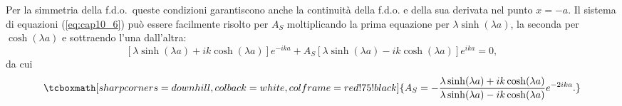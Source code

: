 Per la simmetria della f.d.o.~queste condizioni garantiscono anche la continuità della f.d.o. e della sua derivata nel punto $x=-a$. Il sistema di equazioni (\ref{eq:cap10_6}) può essere facilmente risolto per $A_S$ moltiplicando la prima equazione per $\lambda \sinh (\lambda a)$, la seconda per $\cosh (\lambda a)$ e sottraendo l'una dall'altra:
	\begin{equation}
		\left[\lambda \sinh (\lambda a)+ ik\cosh (\lambda a) \right]e^{-ika}+ A_S \left[\lambda \sinh (\lambda a)-ik \cosh (\lambda a) \right]e^{ika}=0,
	\end{equation}
da cui
	\begin{equation}
		\tcboxmath[sharp corners=downhill, colback=white, colframe=red!75!black]{	
			A_S=-\frac{\lambda \sinh (\lambda a)+ik \cosh (\lambda a)}{\lambda \sinh (\lambda a)-ik \cosh (\lambda a)}e^{-2ika}.
			}
	\label{eq:cap10_7}
	\end{equation}\\
	
